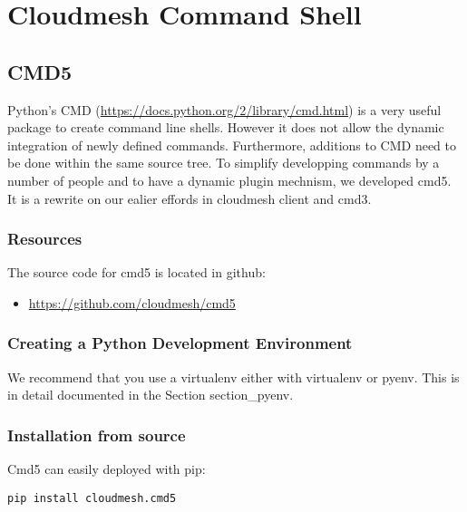 \chapter{Cloudmesh Command Shell}
\label{C:python-cmd5}

\FILENAME

\section{CMD5}\label{cmd5}

Python's CMD (\url{https://docs.python.org/2/library/cmd.html}) is a
very useful package to create command line shells. However it does not
allow the dynamic integration of newly defined commands. Furthermore,
additions to CMD need to be done within the same source tree. To
simplify developping commands by a number of people and to have a
dynamic plugin mechnism, we developed cmd5. It is a rewrite on our
ealier effords in cloudmesh client and cmd3.

\subsection{Resources}

The source code for cmd5 is located in github:

\begin{itemize}

\item
  \url{https://github.com/cloudmesh/cmd5}
\end{itemize}

\subsection{Creating a Python Development
Environment}\label{creating-a-python-development-environment}

We recommend that you use a virtualenv either with virtualenv or pyenv.
This is in detail documented in the Section section\_pyenv.

\subsection{Installation from source}\label{installation-from-source}

Cmd5 can easily deployed with pip:

\begin{verbatim}
pip install cloudmesh.cmd5
\end{verbatim}

